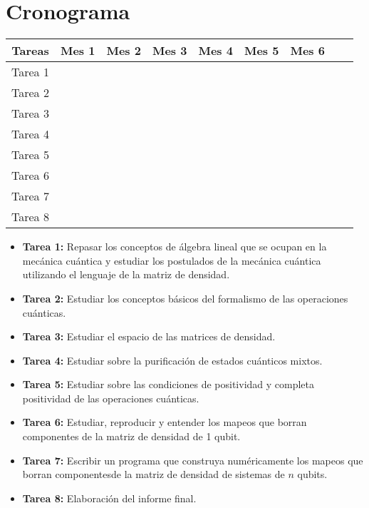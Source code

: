 \documentclass[11pt, spanish, letterpage]{article} %
\begin{document}
\section{Cronograma} %
\begin{center}
\begingroup
\setlength{\tabcolsep}{10pt} %
\renewcommand{\arraystretch}{1.2} %
\begin{tabular}{|c|c|c|c|c|c|c|c|c|}
\hline
\textbf{Tareas} & \textbf{Mes 1} & \textbf{Mes 2} & \textbf{Mes 3} & \textbf{Mes 4} & \textbf{Mes 5} & \textbf{Mes 6} \\ \hline
Tarea 1 & \cellcolor[gray]{0.5} &  &  &  &  &	\\ \hline
Tarea 2 & \cellcolor[gray]{0.5} & & & & &	\\ \hline
Tarea 3 & & \cellcolor[gray]{0.5} & & & &	\\ \hline
Tarea 4 & & \cellcolor[gray]{0.5} & & & &	\\ \hline
Tarea 5 & & & \cellcolor[gray]{0.5} & & &	\\ \hline
Tarea 6 & & & \cellcolor[gray]{0.5} & & &	\\ \hline
Tarea 7 & & & \cellcolor[gray]{0.5} & \cellcolor[gray]{0.5} & \cellcolor[gray]{0.5} &	\\ \hline
Tarea 8 & & & & & & \cellcolor[gray]{0.5}	\\ \hline
\end{tabular}
\endgroup
\end{center}

\begin{itemize}
	\item \textbf{Tarea 1:} Repasar los conceptos de álgebra lineal que se ocupan
	en la mecánica cuántica y estudiar los postulados de la mecánica cuántica 
	utilizando el lenguaje de la matriz de densidad.
	\item \textbf{Tarea 2:} Estudiar los conceptos básicos del formalismo de las
	operaciones cuánticas.
	\item \textbf{Tarea 3:} Estudiar el espacio de las matrices de densidad.
	\item \textbf{Tarea 4:} Estudiar sobre la purificación de estados cuánticos mixtos.
	\item \textbf{Tarea 5:} Estudiar sobre las condiciones de positividad y completa
	positividad de las operaciones cuánticas.
	\item \textbf{Tarea 6:} Estudiar, reproducir y entender los mapeos que borran 
	componentes de la matriz de densidad de 1 qubit.
	\item \textbf{Tarea 7:} Escribir un programa que construya numéricamente los mapeos
	que borran componentesde la matriz de densidad de sistemas de $n$ qubits.
	\item \textbf{Tarea 8:} Elaboración del informe final. 
\end{itemize}



\end{document}
